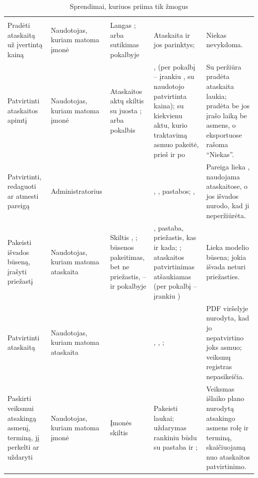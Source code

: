 \begin{xltabular}{\textwidth}{@{}L{25mm}L{18mm}L{24mm}YL{31mm}@{}}
\caption{Sprendimai, kuriuos priima tik žmogus}\label{tab:control:people}\\
\toprule
{} &  &  &  &  \\
\midrule
\endfirsthead
\toprule
{} &  &  &  &  \\
\midrule
\endhead
\bottomrule
\endlastfoot
Pradėti ataskaitą už įvertintą kainą & Naudotojas, kuriam matoma įmonė & Langas ; arba sutikimas pokalbyje & Ataskaita ir jos parinktys;  & Niekas nevykdoma. \\
Patvirtinti ataskaitos apimtį & Naudotojas, kuriam matoma įmonė & Ataskaitos aktų skiltis su juosta ; arba pokalbis & ,  (per pokalbį -- įrankiu , su naudotojo patvirtinta kaina);  su kiekvienu aktu, kurio traktavimą asmuo pakeitė, prieš ir po & Su peržiūra pradėta ataskaita laukia; pradėta be jos įrašo laiką be asmens, o eksportuose rašoma \enquote{Niekas}. \\
Patvirtinti, redaguoti ar atmesti pareigą & Administratorius &  & , , pastabos; ,  & Pareiga lieka , naudojama ataskaitose, o jos išvados nurodo, kad ji neperžiūrėta. \\
Pakeisti išvados būseną, įrašyti priežastį & Naudotojas, kuriam matoma ataskaita & Skiltis , ; būsenos pakeitimas, bet ne priežastis, -- ir pokalbyje & , pastaba, priežastis, kas ir kada; ; ataskaitos patvirtinimas atšaukiamas (per pokalbį -- įrankiu ) & Lieka modelio būsena; jokia išvada neturi priežasties. \\
Patvirtinti ataskaitą & Naudotojas, kuriam matoma ataskaita &  & , , ;  & PDF viršelyje nurodyta, kad jo nepatvirtino joks asmuo; veiksmų registras nepasikeičia. \\
Paskirti veiksmui atsakingą asmenį, terminą, jį perkelti ar uždaryti & Naudotojas, kuriam matoma įmonė & Įmonės skiltis  & Pakeisti laukai; uždarymas rankiniu būdu su pastaba ir ;  & Veiksmas išlaiko plano nurodytą atsakingo asmens rolę ir terminą, skaičiuojamą nuo ataskaitos patvirtinimo. \\

\end{xltabular}
